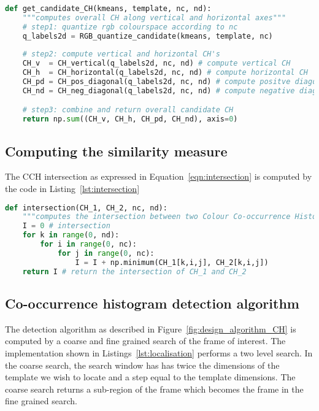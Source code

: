 \begin{lstlisting}[language=Python, caption={Computing candidate CH}, captionpos=b, label={lst:chcand}]
def get_candidate_CH(kmeans, template, nc, nd):
    """computes overall CH along vertical and horizontal axes"""
    # step1: quantize rgb colourspace according to nc
    q_labels2d = RGB_quantize_candidate(kmeans, template, nc)
    
    # step2: compute vertical and horizontal CH's
    CH_v  = CH_vertical(q_labels2d, nc, nd) # compute vertical CH
    CH_h  = CH_horizontal(q_labels2d, nc, nd) # compute horizontal CH
    CH_pd = CH_pos_diagonal(q_labels2d, nc, nd) # compute positve diagonal CH
    CH_nd = CH_neg_diagonal(q_labels2d, nc, nd) # compute negative diagonal CH

    # step3: combine and return overall candidate CH
    return np.sum((CH_v, CH_h, CH_pd, CH_nd), axis=0)
\end{lstlisting}

\subsection{Computing the similarity measure}
The CCH intersection as expressed in
Equation~\ref{eqn:intersection} is computed by the code in
Listing~\ref{lst:intersection}

\begin{lstlisting}[language=Python, caption={Computing intersection of two CCH's}, captionpos=b, label={lst:intersection}]
def intersection(CH_1, CH_2, nc, nd):
    """computes the intersection between two Colour Co-occurrence Histograms""" 
    I = 0 # intersection
    for k in range(0, nd):
        for i in range(0, nc):
            for j in range(0, nc):
                I = I + np.minimum(CH_1[k,i,j], CH_2[k,i,j])
    return I # return the intersection of CH_1 and CH_2
\end{lstlisting}

\subsection{Co-occurrence histogram detection algorithm}
The detection algorithm as described in Figure~\ref{fig:design_algorithm_CH}
is computed by a coarse and fine grained search of the frame of interest. 
The implementation shown in Listings~\ref{lst:localisation} performs a two level
search. In the coarse search, the search window has has twice the dimensions of the
template we wish to locate and a step equal to the template dimensions. The
coarse search returns a sub-region of the frame which becomes the frame in the
fine grained search. 


